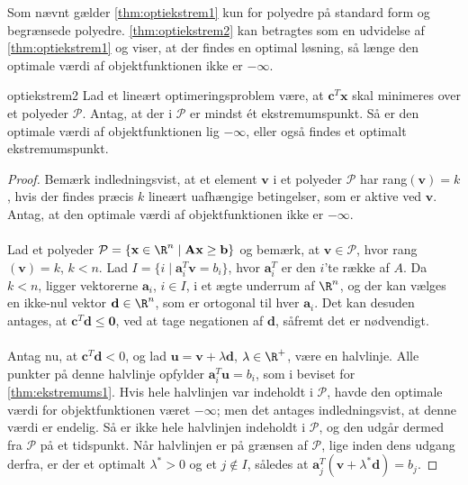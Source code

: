 %
%
%
Som nævnt gælder \ref{thm:optiekstrem1} kun for polyedre på standard form og begrænsede polyedre. 
\ref{thm:optiekstrem2} kan betragtes som en udvidelse af \ref{thm:optiekstrem1} og viser, at der findes en optimal løsning, så længe den optimale værdi af objektfunktionen ikke er $-\infty$. 
%
\begin{thm}{}{optiekstrem2}
Lad et lineært optimeringsproblem være, at $\textbf{c}^T \textbf{x}$ skal minimeres over et polyeder $\mathcal{P}$. 
Antag, at der i $\mathcal{P}$ er mindst ét ekstremumspunkt. 
Så er den optimale værdi af objektfunktionen lig $- \infty$, eller også findes et optimalt ekstremumspunkt. 
\end{thm}
%
\begin{proof}
Bemærk indledningsvist, at et element $\textbf{v}$ i et polyeder $\mathcal{P}$ har rang$(\textbf{v})=k$, hvis der findes præcis $k$ lineært uafhængige betingelser, som er aktive ved $\textbf{v}$. 
Antag, at den optimale værdi af objektfunktionen ikke er $-\infty$. 
\\\\
%
Lad et polyeder $\mathcal{P} = \{\textbf{x} \in \R^n \mid \textbf{A}\textbf{x} \geq \textbf{b} \}$ og bemærk, at $\textbf{v} \in \mathcal{P}$, hvor rang$(\textbf{v})=k$, $k < n$. 
Lad $I = \{ i \mid \textbf{a}^T_i \textbf{v} = b_i \}$, hvor $\textbf{a}^T_i$ er den $i$'te række af $A$. 
Da $k < n$, ligger vektorerne $\textbf{a}_i$, $i \in I$, i et ægte underrum af $ \R^n$, og der kan vælges en ikke-nul vektor $\textbf{d} \in \R^n$, som er ortogonal til hver $\textbf{a}_i$. 
Det kan desuden antages, at $\textbf{c}^T \textbf{d} \leq \textbf{0}$, ved at tage negationen af $\textbf{d}$, såfremt det er nødvendigt. 
\\\\
%
Antag nu, at $\textbf{c}^T \textbf{d} < 0$, og lad $\textbf{u} = \textbf{v} + \lambda \textbf{d}$, $ \lambda \in \R^+$, være en halvlinje. 
Alle punkter på denne halvlinje opfylder $\textbf{a}^T_i \textbf{u} = b_i$, som i beviset for \ref{thm:ekstremums1}. 
Hvis hele halvlinjen var indeholdt i $\mathcal{P}$, havde den optimale værdi for objektfunktionen været $- \infty $; men det antages indledningsvist, at denne værdi er endelig. 
Så er ikke hele halvlinjen indeholdt i $\mathcal{P}$, og den udgår dermed fra $\mathcal{P}$ på et tidspunkt. 
Når halvlinjen er på grænsen af $\mathcal{P}$, lige inden dens udgang derfra, er der et optimalt $ \lambda^* > 0$ og et $j \notin I$, således at $\textbf{a}^T_j (\textbf{v} + \lambda^* \textbf{d} ) = b_j $.

\end{proof}
